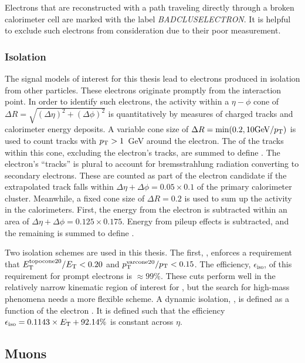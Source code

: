 Electrons that are reconstructed with a path traveling directly through a broken calorimeter cell are marked with the label \emph{BADCLUSELECTRON}.
It is helpful to exclude such electrons from consideration due to their poor \et measurement.

\subsubsection{Isolation}
The signal models of interest for this thesis lead to electrons produced in isolation from other particles.
These electrons originate promptly from the interaction point.
In order to identify such electrons, the activity within a $\eta-\phi$ cone of $\Delta R=\sqrt{(\Delta\eta)^2+(\Delta\phi)^2}$ is quantitatively by measures of charged tracks and calorimeter energy deposits.
A variable cone size of $\Delta R=\text{min}(0.2,10\text{GeV}/p_\text{T})$ is used to count tracks with $p_\text{T}>1$~GeV around the electron. The \pt of the tracks within this cone, excluding the electron's tracks, are summed to define \ptvarconeElec.
The electron's ``tracks'' is plural to account for bremsstrahlung radiation converting to secondary electrons. 
These are counted as part of the electron candidate if the extrapolated track falls within $\Delta\eta+\Delta\phi=0.05\times0.1$ of the primary calorimeter cluster.
Meanwhile, a fixed cone size of $\Delta R=0.2$ is used to sum up the activity in the calorimeters.
First, the energy from the electron is subtracted within an area of $\Delta\eta+\Delta\phi=0.125\times0.175$.
Energy from pileup effects is subtracted, and the remaining \et is summed to define \etcone.

Two isolation schemes are used in this thesis.
The first, , enforces a requirement that $E_\text{T}^\text{topocone20}/E_\text{T}<0.20$ and $p_\text{T}^\text{varcone20}/p_\text{T}<0.15$.
The efficiency, $\epsilon_\text{iso}$, of this requirement for prompt electrons is $\approx99\%$.
These cuts perform well in the relatively narrow kinematic region of interest for \hmm, but the search for high-mass phenomena needs a more flexible scheme.
A dynamic isolation, , is defined as a function of the electron \et.
It is defined such that the efficiency $\epsilon_\text{iso}=0.1143\times E_\text{T}+92.14\%$ is constant across $\eta$.
\cite{elecReco}



\subsection{Muons}

